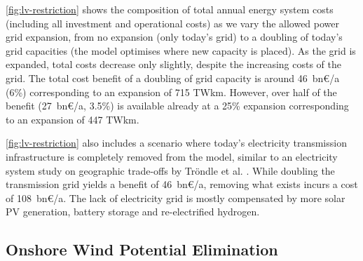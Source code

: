 \cref{fig:lv-restriction} shows the composition of total annual energy system costs
(including all investment and operational costs) as we vary the allowed power
grid expansion, from no expansion (only today's grid) to a doubling of today's
grid capacities (the model optimises where new capacity is placed). As the grid
is expanded, total costs decrease only slightly, despite the increasing costs of
the grid. The total cost benefit of a doubling of grid capacity is around
46~bn\euro/a (6\%) corresponding to an expansion of 715 TWkm. However, over half
of the benefit (27~bn\euro/a, 3.5\%) is available already at a 25\% expansion
corresponding to an expansion of 447 TWkm.

\cref{fig:lv-restriction} also includes a scenario where today's electricity
transmission infrastructure is completely removed from the model, similar to an
electricity system study on geographic trade-offs by Tröndle et
al. . While doubling the transmission grid
yields a benefit of 46~bn\euro/a, removing what exists incurs a cost of
108~bn\euro/a. The lack of electricity grid is mostly compensated by more solar
PV generation, battery storage and re-electrified hydrogen.

\subsection{Onshore Wind Potential Elimination}
\label{sec:si:onw}

